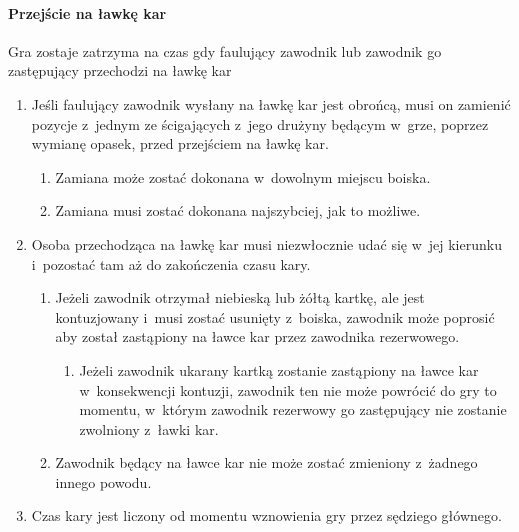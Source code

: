 \documentclass[12pt,a4paper]{article}
\begin{document}
\paragraph{Przejście na ławkę kar}
Gra zostaje zatrzyma na czas
gdy faulujący zawodnik lub zawodnik go zastępujący przechodzi na ławkę
kar

\begin{enumerate}
	\item
	      Jeśli faulujący zawodnik wysłany na ławkę kar jest obrońcą, musi on
	      zamienić pozycje z~jednym ze ścigających z~jego drużyny będącym w~grze, poprzez wymianę opasek, przed przejściem na ławkę kar.

	      \begin{enumerate}
		      \item
		            Zamiana może zostać dokonana w~dowolnym miejscu boiska.
		      \item
		            Zamiana musi zostać dokonana najszybciej, jak to możliwe.
	      \end{enumerate}
	\item
	      Osoba przechodząca na ławkę kar musi niezwłocznie udać się w~jej
	      kierunku i~pozostać tam aż do zakończenia czasu kary.

	      \begin{enumerate}
		      \item
		            Jeżeli zawodnik otrzymał niebieską lub żółtą kartkę, ale jest
		            kontuzjowany i~musi zostać usunięty z~boiska, zawodnik może poprosić
		            aby został zastąpiony na ławce kar przez zawodnika rezerwowego.

		            \begin{enumerate}
			            \item
			                  Jeżeli zawodnik ukarany kartką zostanie zastąpiony na ławce kar w~konsekwencji kontuzji, zawodnik ten nie może powrócić do gry to
			                  momentu, w~którym zawodnik rezerwowy go zastępujący nie zostanie
			                  zwolniony z~ławki kar.
		            \end{enumerate}
		      \item
		            Zawodnik będący na ławce kar nie może zostać zmieniony z~żadnego
		            innego powodu.
	      \end{enumerate}
	\item
	      Czas kary jest liczony od momentu wznowienia gry przez sędziego
	      głównego.
\end{enumerate}
\end{document}
